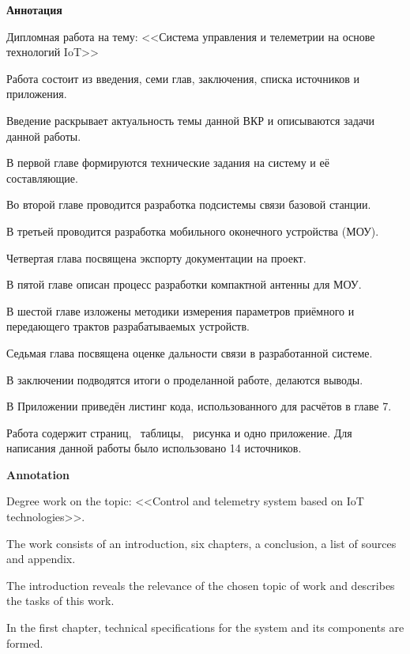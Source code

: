 {\Large\normalfont\bfseries \hfil Аннотация}
\vspace{1em}
\thispagestyle{empty}

Дипломная работа на тему: <<Система управления и телеметрии на основе технологий IoT>>

Работа состоит из введения, семи глав, заключения, списка источников и приложения.

Введение раскрывает актуальность темы данной ВКР и описываются задачи данной работы.

В первой главе формируются технические задания на систему и её составляющие.

Во второй главе проводится разработка подсистемы связи базовой станции.

В третьей проводится разработка мобильного оконечного устройства \linebreak(МОУ).

Четвертая глава посвящена экспорту документации на проект.

В пятой главе описан процесс разработки компактной антенны для МОУ.

В шестой главе изложены методики измерения параметров приёмного и передающего трактов разрабатываемых устройств.

Седьмая глава посвящена оценке дальности связи в разработанной системе.

В заключении подводятся итоги о проделанной работе, делаются выводы.

В Приложении приведён листинг кода, использованного для расчётов в главе 7.

Работа содержит \pageref*{LastPage} страниц, \totalfigures\ таблицы, \totaltables\ рисунка и одно приложение. Для написания данной работы было использовано 14 источников. 

\newpage
{\Large\normalfont\bfseries \hfil Annotation}
\vspace{1em}
\thispagestyle{empty}

Degree work on the topic: <<Control and telemetry system based on IoT \linebreak technologies>>.

The work consists of an introduction, six chapters, a conclusion, a list of sources and appendix.

The introduction reveals the relevance of the chosen topic of work and describes the tasks of this work.

In the first chapter, technical specifications for the system and its components are formed.

